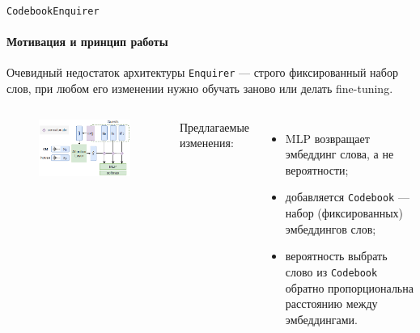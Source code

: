 \documentclass[aspectratio=43]{beamer}
\newcommand{\enquirer}{\texttt{Enquirer}}
\begin{document}
\begin{frame}{\texttt{CodebookEnquirer}}
    \framesubtitle{Мотивация и принцип работы}
    Очевидный недостаток архитектуры \enquirer{} --- строго фиксированный набор
    слов, при любом его изменении нужно обучать заново или делать fine-tuning.
    \vspace{1em}

    \begin{columns}

    \begin{figure}[bht]
    \includegraphics[width=\textwidth]{guesser.png}
    \end{figure}

    Предлагаемые изменения:
    \begin{itemize}
        \item MLP возвращает эмбеддинг слова, а не вероятности;
        \item добавляется \texttt{Codebook} --- набор (фиксированных)
            эмбеддингов слов;
        \item вероятность выбрать слово из \texttt{Codebook} обратно
            пропорциональна расстоянию между эмбеддингами.
    \end{itemize}

    \end{columns}
\end{frame}
\end{document}
